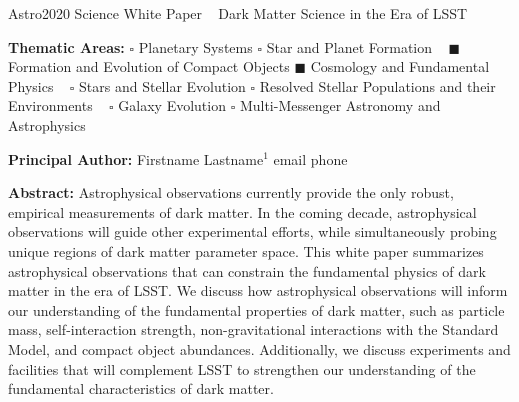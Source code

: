 \documentclass[12pt]{article}
\begin{document}
\begin{raggedright} 
\huge
Astro2020 Science White Paper \hfill ~ \linebreak
Dark Matter Science in the Era of LSST \hfill ~ \linebreak
\end{raggedright}
\normalsize

\noindent \textbf{Thematic Areas:} \hspace*{58pt} $\square$ Planetary Systems \hspace*{12pt} $\square$ Star and Planet Formation  \hfill ~\linebreak
$\blacksquare$ Formation and Evolution of Compact Objects \hspace*{31pt} $\blacksquare$ Cosmology and Fundamental Physics \hfill ~ \linebreak
  $\square$  Stars and Stellar Evolution \hspace*{1pt} $\square$ Resolved Stellar Populations and their Environments \hspace*{40pt} \hfill ~\linebreak
  $\square$    Galaxy Evolution   \hspace*{45pt} $\square$             Multi-Messenger Astronomy and Astrophysics \hspace*{65pt} \hfill ~ \linebreak
  
\noindent \textbf{Principal Author:} 
Firstname Lastname$^{1}$ email phone



\noindent \textbf{Abstract:}
Astrophysical observations currently provide the only robust, empirical measurements of dark matter. 
In the coming decade, astrophysical observations will guide other experimental efforts, while simultaneously probing unique regions of dark matter parameter space.
This white paper summarizes astrophysical observations that can constrain the fundamental physics of dark matter in the era of LSST. 
We discuss how astrophysical observations will inform our understanding of the fundamental properties of dark matter, such as particle mass, self-interaction strength, non-gravitational interactions with the Standard Model, and compact object abundances. Additionally, we discuss experiments and facilities that will complement LSST to strengthen our understanding of the fundamental characteristics of dark matter.
\end{document}
